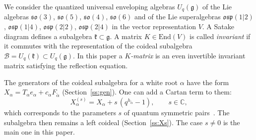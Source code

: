 \documentclass[12pt,a4paper]{article}
\newcommand{\g}{\mathfrak{g}}
\newcommand{\kk}{\mathfrak{k}}
\newcommand{\so}{\mathfrak{so}}
\newcommand{\osp}{\mathfrak{osp}}
\newcommand{\Uq}{U_q}
\newcommand{\ta}{\tilde\alpha}
\begin{document}
We consider the quantized universal enveloping algebras $\Uq(\g)$ of the Lie algebras $\so(3)$, $\so(5)$, $\so(4)$, $\so(6)$ and of the Lie superalgebras $\osp(1|2)$, $\osp(1|4)$,
$\osp(2|2)$, $\osp(2|4)$ in the vector representation $V$. A Satake diagram defines a subalgebra $\kk\subset\g$. A matrix $K\in\mathrm{End}(V)$ is called \emph{invariant} if it commutes with the representation of the coideal subalgebra $\mathcal B=\Uq(\kk)\subset\Uq(\g)$. In this paper a \emph{$K$-matrix} is
an even invertible invariant matrix satisfying the reflection equation.

The generators of the coideal subalgebra for a white root $\alpha$ have the form $X_\alpha=T_\alpha e_\alpha+c_\alpha F_{\ta}$
(Section~\ref{ss:gen}). One can add a Cartan term to them:
\[
X^{(s)}_\alpha=X_\alpha+s\,(q^{h_{\ta}}-1),\qquad s\in\mathbb C,
\]
which corresponds to the parameters $s$ of quantum symmetric pairs~\cite{K1}. The subalgebra then remains a left coideal
(Section~\ref{ss:Xs}). The case $s\neq0$ is the main one in this paper.
\end{document}
